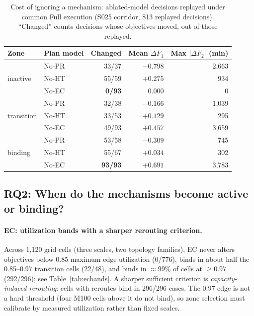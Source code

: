 \documentclass[10pt,conference,letterpaper]{IEEEtran}
\begin{document}
\begin{table}[t]
\centering
\caption{Cost of ignoring a mechanism: ablated-model decisions replayed
under common Full execution (S025 corridor, 813 replayed decisions).
``Changed'' counts decisions whose objectives moved, out of those
replayed.}
\label{tab:replay}
\setlength{\tabcolsep}{4.5pt}
\begin{tabular}{llrrr}
\toprule
Zone & Plan model & Changed & Mean $\Delta F_1$ & Max $|\Delta F_2|$ (min) \\
\midrule
\multirow{3}{*}{inactive}
 & No-PR & 33/37 & $-0.798$ & 2{,}663 \\
 & No-HT & 55/59 & $+0.275$ & 934 \\
 & No-EC & \textbf{0/93} & $0.000$ & 0 \\
\midrule
\multirow{3}{*}{transition}
 & No-PR & 32/38 & $-0.166$ & 1{,}039 \\
 & No-HT & 33/53 & $+0.129$ & 295 \\
 & No-EC & 49/93 & $+0.457$ & 3{,}659 \\
\midrule
\multirow{3}{*}{binding}
 & No-PR & 53/58 & $-0.309$ & 745 \\
 & No-HT & 55/67 & $+0.034$ & 302 \\
 & No-EC & \textbf{93/93} & $+0.691$ & 3{,}783 \\
\bottomrule
\end{tabular}
\end{table}

\subsection{RQ2: When do the mechanisms become active or binding?}

\paragraph{EC: utilization bands with a sharper rerouting criterion.}
Across 1{,}120 grid cells (three scales, two topology families), EC never
alters objectives below 0.85 maximum edge utilization (0/776), binds in
about half the 0.85--0.97 transition cells (22/48), and binds in
$\approx$99\% of cells at $\ge$0.97 (292/296); see
Table~\ref{tab:ecbands}. A sharper sufficient
criterion is \emph{capacity-induced rerouting}: cells with reroutes bind
in 296/296 cases. The 0.97 edge is not a hard threshold (four M100 cells
above it do not bind), so zone selection must calibrate by measured
utilization rather than fixed scales.
\end{document}
